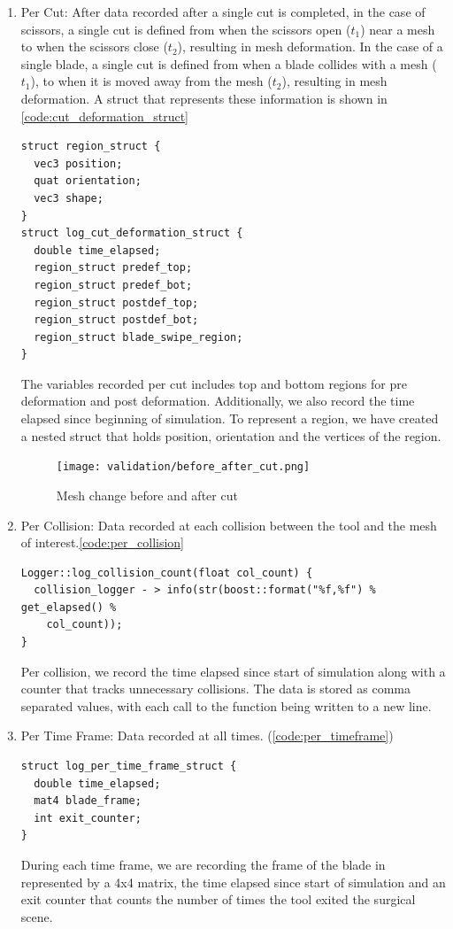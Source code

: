 \begin{enumerate}
    \item Per Cut: After data recorded after a single cut is completed, in the case of scissors, a single cut is defined from when the scissors open ($t_1$) near a mesh to when the scissors close ($t_2$), resulting in mesh deformation. In the case of a single blade, a single cut is defined from when a blade collides with a mesh ($t_1$), to when it is moved away from the mesh ($t_2$), resulting in mesh deformation. A struct that represents these information is shown in \autoref{code:cut_deformation_struct}
    \begin{lstlisting}[style=CStyle, caption={Cut deformation struct}, label={code:cut_deformation_struct}]
struct region_struct {
  vec3 position;
  quat orientation;
  vec3 shape;
}
struct log_cut_deformation_struct {
  double time_elapsed;
  region_struct predef_top;
  region_struct predef_bot;
  region_struct postdef_top;
  region_struct postdef_bot;
  region_struct blade_swipe_region;
}
    \end{lstlisting}
    The variables recorded per cut includes top and bottom regions for pre deformation and post deformation. Additionally, we also record the time elapsed since beginning of simulation. To represent a region, we have created a nested struct that holds position, orientation and the vertices of the region.
    \begin{figure}
      \centering%
      \texttt{[image: validation/before\_after\_cut.png]}
      \caption{Mesh change before and after cut}
      \label{fig:before_after_cut}
    \end{figure}

    \item Per Collision: Data recorded at each collision between the tool and the mesh of interest.\autoref{code:per_collision}
    \begin{lstlisting}[style=CStyle, caption={Log per collision}, label={code:per_collision}]
Logger::log_collision_count(float col_count) {
  collision_logger - > info(str(boost::format("%f,%f") % get_elapsed() %
    col_count));
}
    \end{lstlisting}
   Per collision, we record the time elapsed since start of simulation along with a counter that tracks unnecessary collisions. The data is stored as comma separated values, with each call to the function being written to a new line.

    \item Per Time Frame: Data recorded at all times. (\autoref{code:per_timeframe})
    \begin{lstlisting}[style=CStyle, caption={Struct for logging per time frame}, label={code:per_timeframe}]
struct log_per_time_frame_struct {
  double time_elapsed;
  mat4 blade_frame;
  int exit_counter;
}
    \end{lstlisting}
    During each time frame, we are recording the frame of the blade in represented by a 4x4 matrix, the time elapsed since start of simulation and an exit counter that counts the number of times the tool exited the surgical scene.

\end{enumerate}

